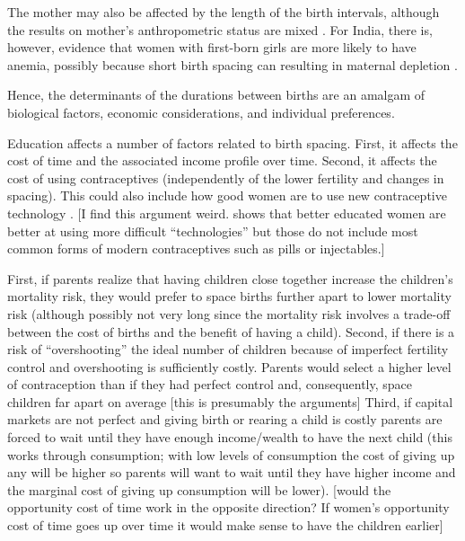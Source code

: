 The mother may also be affected by the length of the birth intervals, although the
results on mother's anthropometric status are mixed \citep{Dewey2007,Conde-Agudelo2012}.
For India, there is, however, evidence that women with first-born girls are more likely to 
have anemia, possibly because short birth spacing can resulting in maternal depletion 
\citep{Milazzo2018}.











Hence, the determinants of the durations between births are an amalgam of biological 
factors, economic considerations, and individual preferences.






Education affects a number of factors related to birth spacing.
First, it affects the cost of time and the associated income profile over time.
Second, it affects the cost of using contraceptives (independently of the lower fertility
and changes in spacing). This could also include how good women are to use new 
contraceptive technology \citep{Kim2010}.
[I find this argument weird. \citep{Rosenzweig1989} shows that better educated women
are better at using more difficult ``technologies'' but those do not include most common
forms of modern contraceptives such as pills or injectables.]


First, if parents realize that having children close together increase the children's
mortality risk, they would prefer to space births further apart to lower mortality risk
(although possibly not very long since the mortality risk involves a trade-off between the
cost of births and the benefit of having a child).
Second, if there is a risk of ``overshooting'' the ideal number of children because of
imperfect fertility control and overshooting is sufficiently costly.
Parents would select a higher level of contraception than if they had perfect control and,
consequently, space children far apart on average [this is presumably
the \citep{Keyfitz1971,Heckman1976} arguments]
Third, if capital markets are not perfect and giving birth or rearing a child is costly
parents are forced to wait until they have enough income/wealth to have the next child
(this works through consumption; with low levels of consumption the cost of giving up
any will be higher so parents will want to wait until they have higher income and the
marginal cost of giving up consumption will be lower).
[would the opportunity cost of time work in the opposite direction? If women's 
opportunity cost of time goes up over time it would make sense to have the children
earlier]

